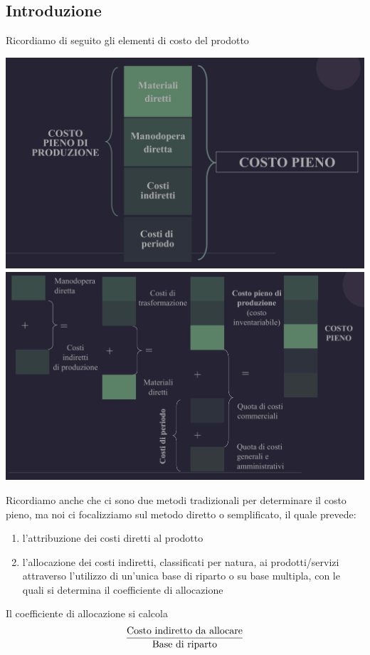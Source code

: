 \documentclass{article}
\begin{document}
\subsection{Introduzione}
Ricordiamo di seguito gli elementi di costo del prodotto
\begin{center}
    \includegraphics[scale=0.3]{Image/ElemCosto_3.png}
    \includegraphics[scale=0.3]{Image/ElemCosto_4.png}
\end{center}
Ricordiamo anche che ci sono due metodi tradizionali per determinare il costo pieno, ma noi ci focalizziamo sul metodo diretto o semplificato, il quale prevede:
\begin{enumerate}
    \item l'attribuzione dei costi diretti al prodotto
    \item l'allocazione dei costi indiretti, classificati per natura, ai prodotti/servizi attraverso l'utilizzo di un'unica base di riparto o su base multipla, con le quali si determina il coefficiente di allocazione
\end{enumerate}
Il coefficiente di allocazione si calcola
\[
    \frac{\text{Costo indiretto da allocare}}{\text{Base di riparto}}
\]
\end{document}
